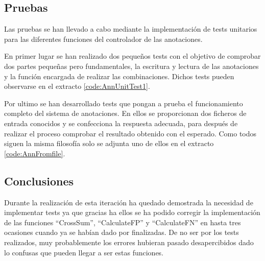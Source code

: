    \subsection{Pruebas}
    
    Las pruebas se han llevado a cabo mediante la implementación de tests unitarios para las diferentes funciones del controlador de las anotaciones. 
    
    En primer lugar se han realizado dos pequeños tests con el objetivo de comprobar dos partes pequeñas pero fundamentales, la escritura y lectura de las anotaciones y la función encargada de realizar las combinaciones. Dichos tests pueden observarse en el extracto \ref{code:AnnUnitTest1}.
    
    
    Por ultimo se han desarrollado tests que pongan a prueba el funcionamiento completo del sistema de anotaciones. En ellos se proporcionan dos ficheros de entrada conocidos y se confecciona la respuesta adecuada, para después de realizar el proceso comprobar el resultado obtenido con el esperado. Como todos siguen la misma filosofía solo se adjunta uno de ellos en el extracto \ref{code:AnnFromfile}.
    
    
    \subsection{Conclusiones}
    
    Durante la realización de esta iteración ha quedado demostrada la necesidad de implementar tests ya que gracias ha ellos se ha podido corregir la implementación de las funciones ``CrossSum'', ``CalculateFP'' y ``CalculateFN'' en hasta tres ocasiones cuando ya se habían dado por finalizadas. De no ser por los tests realizados, muy probablemente los errores hubieran pasado desapercibidos dado lo confusas que pueden llegar a ser estas funciones.
